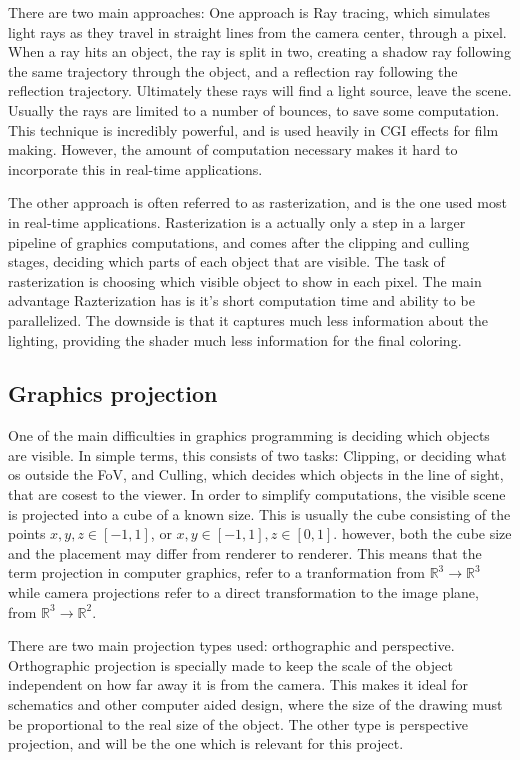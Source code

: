 There are two main approaches: One approach is Ray tracing, which simulates light rays as they travel in straight lines from the camera center, through a pixel. When a ray hits an object, the ray is split in two, creating a shadow ray following the same trajectory through the object, and a reflection ray following the reflection trajectory. Ultimately these rays will find a light source, leave the scene. Usually the rays are limited to a number of bounces, to save some computation. This technique is incredibly powerful, and is used heavily in CGI effects for film making. However, the amount of computation necessary makes it hard to incorporate this in real-time applications.

The other approach is often referred to as rasterization, and is the one used most in real-time applications. Rasterization is a actually only a step in a larger pipeline of graphics computations, and comes after the clipping and culling stages, deciding which parts of each object that are visible. The task of rasterization is choosing which visible object to show in each pixel. The main advantage Razterization has is it's short computation time and ability to be parallelized. The downside is that it captures much less information about the lighting, providing the shader much less information for the final coloring.

\subsection{Graphics projection}

One of the main difficulties in graphics programming is deciding which objects are visible. In simple terms, this consists of two tasks: Clipping, or deciding what os outside the FoV, and Culling, which decides which objects in the line of sight, that are cosest to the viewer. In order to simplify computations, the visible scene is projected into a cube of a known size. This is usually the cube consisting of the points $x, y, z \in [-1,1]$, or $x,y \in [-1,1], z \in [0,1]$. however, both the cube size and the placement may differ from renderer to renderer. This means that the term projection in computer graphics, refer to a tranformation from $\mathbb{R}^3 \rightarrow \mathbb{R}^3$ while camera projections refer to a direct transformation to the image plane, from $\mathbb{R}^3 \rightarrow \mathbb{R}^2$.

There are two main projection types used: orthographic and perspective. Orthographic projection is specially made to keep the scale of the object independent on how far away it is from the camera. This makes it ideal for schematics and other computer aided design, where the size of the drawing must be proportional to the real size of the object. The other type is perspective projection, and will be the one which is relevant for this project.

